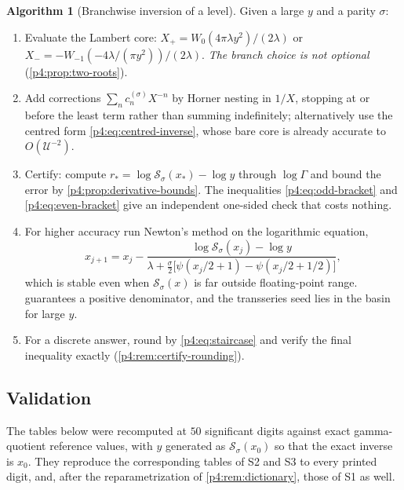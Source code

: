\documentclass[11pt,a4paper,oneside]{book}
\theoremstyle{plain}
\theoremstyle{definition}
\newtheorem{algorithm}[theorem]{Algorithm}
\theoremstyle{remark}
\newcommand{\Wlam}{W}
\newcommand{\Xcore}{X}
\begin{document}
\begin{algorithm}[Branchwise inversion of a level]
\label{p4:alg:invert}
Given a large $y$ and a parity $\sigma$:
\begin{enumerate}
\item Evaluate the Lambert core:
      $\Xcore_+=\Wlam_0(4\pi\lambda y^{2})/(2\lambda)$ or
      $\Xcore_-=-\Wlam_{-1}(-4\lambda/(\pi y^{2}))/(2\lambda)$.
      \emph{The branch choice is not optional} (\cref{p4:prop:two-roots}).
\item Add corrections $\sum_n c^{(\sigma)}_n\Xcore^{-n}$ by Horner nesting in
      $1/\Xcore$, stopping at or before the least term rather than summing
      indefinitely; alternatively use the centred form
      \cref{p4:eq:centred-inverse}, whose bare core is already accurate to
      $O(\mathcal U^{-2})$.
\item Certify: compute $r_*=\log\mathcal S_\sigma(x_*)-\log y$ through
      $\log\Gamma$ and bound the error by
      \cref{p4:prop:derivative-bounds}.  The inequalities
      \cref{p4:eq:odd-bracket} and \cref{p4:eq:even-bracket} give an
      independent one-sided check that costs nothing.
\item For higher accuracy run Newton's method on the logarithmic equation,
      \[
        x_{j+1}=x_j-\frac{\log\mathcal S_\sigma(x_j)-\log y}
        {\lambda+\tfrac\sigma2\bigl[\psi(x_j/2+1)-\psi(x_j/2+1/2)\bigr]},
      \]
      which is stable even when $\mathcal S_\sigma(x)$ is far outside
      floating-point range.   guarantees a positive
      denominator, and the transseries seed lies in the basin for large $y$.
\item For a discrete answer, round by \cref{p4:eq:staircase} and verify the
      final inequality exactly (\cref{p4:rem:certify-rounding}).
\end{enumerate}
\end{algorithm}

\subsection{Validation}

The tables below were recomputed at $50$ significant digits against exact
gamma-quotient reference values, with $y$ generated as
$\mathcal S_\sigma(x_0)$ so that the exact inverse is $x_0$.  They reproduce
the corresponding tables of \textsf{S2} and \textsf{S3} to every printed
digit, and, after the reparametrization of \cref{p4:rem:dictionary}, those of
\textsf{S1} as well.
\end{document}

